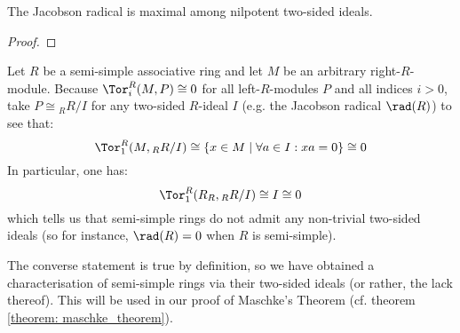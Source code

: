             \begin{proposition} \label{prop: jacobson_radicals_are_nilpotent} 
                The Jacobson radical is maximal among nilpotent two-sided ideals. 
            \end{proposition}
                \begin{proof}
                    
                \end{proof}
            \begin{example} \label{example: two_sided_ideals_in_semi_simple_rings_are_trivial}
                Let $R$ be a semi-simple associative ring and let $M$ be an arbitrary right-$R$-module. Because $\Tor^R_i(M, P) \cong 0$ for all left-$R$-modules $P$ and all indices $i > 0$, take $P \cong {}_RR/I$ for any two-sided $R$-ideal $I$ (e.g. the Jacobson radical $\rad(R)$) to see that:
                    $$\Tor^R_1(M, {}_RR/I) \cong \{x \in M \mid \forall a \in I: xa = 0\} \cong 0$$
                In particular, one has:
                    $$\Tor_1^R(R_R, {}_RR/I) \cong I \cong 0$$
                which tells us that semi-simple rings do not admit any non-trivial two-sided ideals (so for instance, $\rad(R) = 0$ when $R$ is semi-simple). 
                
                The converse statement is true by definition, so we have obtained a characterisation of semi-simple rings via their two-sided ideals (or rather, the lack thereof). This will be used in our proof of Maschke's Theorem (cf. theorem \ref{theorem: maschke_theorem}).
            \end{example}
